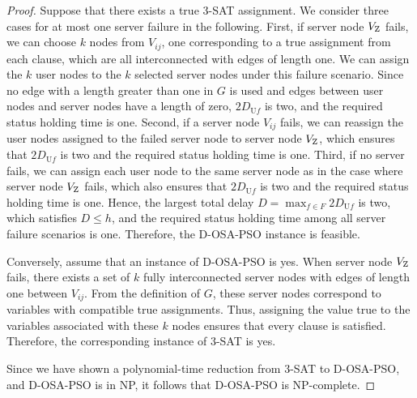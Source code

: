 \documentclass[conference]{IEEEtran}
\begin{document}
\begin{CJK}{UTF8}{ipxm}
\begin{proof}
Suppose that there exists a true 3-SAT assignment. 
We consider three cases for at most one server failure in the following.
First, if server node $V_{\rm Z}$ fails, we can choose $k$ nodes from $V_{ij}$, one corresponding to a true assignment from each clause, which are all interconnected with edges of length one.
We can assign the $k$ user nodes to the $k$ selected server nodes under this failure scenario.
Since no edge with a length greater than one in $G$ is used and edges between user nodes and server nodes have a length of zero, $2D_{\mathrm{U}f}$  is two, and the required status holding time is one.
Second, if a server node $V_{ij}$ fails, we can reassign the user nodes assigned to the failed server node to server node $V_{\rm Z}$, which ensures that $2D_{\mathrm{U}f}$ is two and the required status holding time is one.
Third, if no server fails, we can assign each user node to the same server node as in the case where server node $V_{\rm Z}$ fails, which also ensures that $2D_{\mathrm{U}f}$ is two and the required status holding time is one.
Hence, the largest total delay $D = \max_{f \in F}{2D_{\mathrm{U}f}}$ is two, which satisfies $D \leq h$, and the required status holding time among all server failure scenarios is one.
Therefore, the D-OSA-PSO instance is feasible.

Conversely, assume that an instance of D-OSA-PSO is yes.
When server node $V_{\rm Z}$ fails, there exists a set of $k$ fully interconnected server nodes with edges of length one between $V_{ij}$.
From the definition of $G$, these server nodes correspond to variables with compatible true assignments.
Thus, assigning the value true to the variables associated with these $k$ nodes ensures that every clause is satisfied.
Therefore, the corresponding instance of 3-SAT is yes.

Since we have shown a polynomial-time reduction from 3-SAT to D-OSA-PSO, and D-OSA-PSO is in NP, it follows that D-OSA-PSO is NP-complete.
\end{proof}


\end{CJK}
\end{document}
